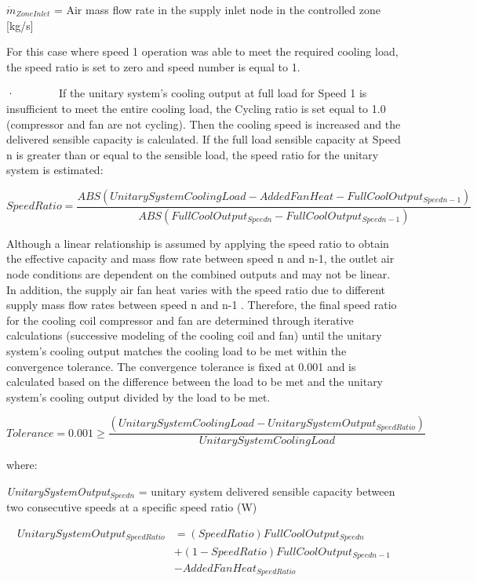 \({\dot m{_{ZoneInlet}}}\) = Air mass flow rate in the supply inlet node in the controlled zone {[}kg/s{]}

For this case where speed 1 operation was able to meet the required cooling load, the speed ratio is set to zero and speed number is equal to 1.

·~~~~~~~~If the unitary system's cooling output at full load for Speed 1 is insufficient to meet the entire cooling load, the Cycling ratio is set equal to 1.0 (compressor and fan are not cycling). Then the cooling speed is increased and the delivered sensible capacity is calculated. If the full load sensible capacity at Speed n is greater than or equal to the sensible load, the speed ratio for the unitary system is estimated:

\begin{equation}
SpeedRatio = \frac{{ABS\left( {UnitarySystemCoolingLoad - AddedFanHeat - FullCoolOutpu{t_{Speedn - 1}}} \right)}}{{ABS\left( {FullCoolOutpu{t_{Speedn}} - FullCoolOutpu{t_{Speedn - 1}}} \right)}}
\end{equation}

Although a linear relationship is assumed by applying the speed ratio to obtain the effective capacity and mass flow rate between speed n and n-1, the outlet air node conditions are dependent on the combined outputs and may not be linear. In addition, the supply air fan heat varies with the speed ratio due to different supply mass flow rates between speed n and n-1 . Therefore, the final speed ratio for the cooling coil compressor and fan are determined through iterative calculations (successive modeling of the cooling coil and fan) until the unitary system's cooling output matches the cooling load to be met within the convergence tolerance. The convergence tolerance is fixed at 0.001 and is calculated based on the difference between the load to be met and the unitary system's cooling output divided by the load to be met.

\begin{equation}
Tolerance = 0.001 \ge \frac{{\left( {UnitarySystemCoolingLoad - UnitarySystemOutpu{t_{SpeedRatio}}} \right)}}{{UnitarySystemCoolingLoad}}
\end{equation}

where:

\emph{UnitarySystemOutput\(_{Speedn}\)} = unitary system delivered sensible capacity between two consecutive speeds at a specific speed ratio (W)

\begin{equation}
  \begin{array}{rl}
    UnitarySystemOutput_{SpeedRatio} &= (SpeedRatio)FullCoolOutput_{Speedn} \\
                                     &+ (1 - SpeedRatio)FullCoolOutput_{Speedn - 1} \\
                                     &- AddedFanHeat_{SpeedRatio}
  \end{array}
\end{equation}

